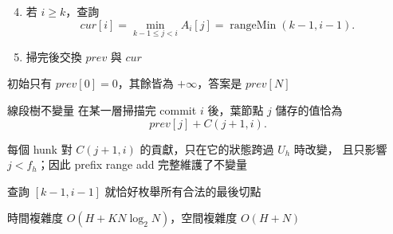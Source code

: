 \begin{frame}{}
    \begin{enumerate}
        \setcounter{enumi}{3}
        \item 若 $i\ge k$，查詢
        \[
            cur[i]=\min_{k-1\le j<i}A_i[j]
                  =\operatorname{rangeMin}(k-1,i-1).
        \]
        \item 掃完後交換 $prev$ 與 $cur$
    \end{enumerate}

    初始只有 $prev[0]=0$，其餘皆為 $+\infty$，答案是 $prev[N]$
\end{frame}

\begin{frame}{}
    \begin{block}{線段樹不變量}
        在某一層掃描完 commit $i$ 後，葉節點 $j$ 儲存的值恰為
        \[
            prev[j]+C(j+1,i).
        \]
    \end{block}

    每個 hunk 對 $C(j+1,i)$ 的貢獻，只在它的狀態跨過 $U_h$ 時改變，
    且只影響 $j<f_h$；因此 prefix range add 完整維護了不變量

    查詢 $[k-1,i-1]$ 就恰好枚舉所有合法的最後切點
\end{frame}

\begin{frame}{}
    時間複雜度 $O(H+KN\log_2 N)$，空間複雜度 $O(H+N)$
\end{frame}
